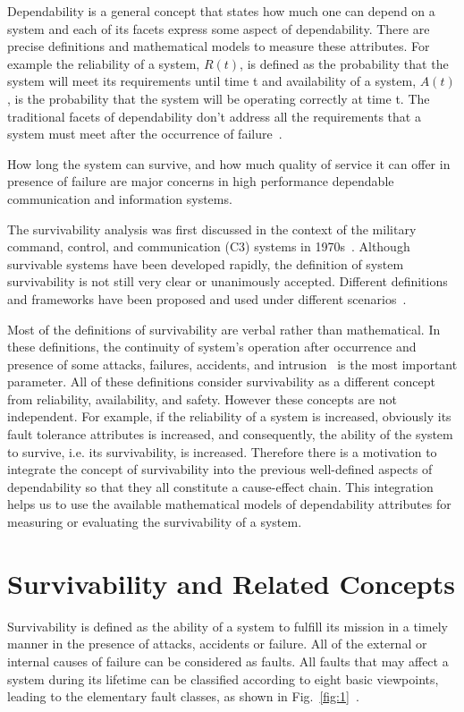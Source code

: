 \documentclass[onecolumn,conference]{IEEEtran}
\begin{document}
    Dependability is a general concept that states how much one can depend on a system and each of its facets express some aspect of dependability. There are precise definitions and mathematical models to measure these attributes. For example the reliability of a system, $R(t)$, is defined as the probability that the system will meet its requirements until time t and availability of a system, $A(t)$, is the probability that the system will be operating correctly at time t. The traditional facets of dependability don't address all the requirements that a system must meet after the occurrence of failure~\cite{b8}.

    How long the system can survive, and how much quality of service it can offer in presence of failure are major concerns in high performance dependable communication and information systems.

    The survivability analysis was first discussed in the context of the military command, control, and communication (C3) systems in 1970s~\cite{b7}. Although survivable systems have been developed rapidly, the definition of system survivability is not still very clear or unanimously accepted. Different definitions and frameworks have been proposed and used under different scenarios~\cite{b10, b12, b18}.

    Most of the definitions of survivability are verbal rather than mathematical. In these definitions, the continuity of system's operation after occurrence and presence of some attacks, failures, accidents, and intrusion~\cite{b11, b13, b14, b15, b16} is the most important parameter. All of these definitions consider survivability as a different concept from reliability, availability, and safety. However these concepts are not independent. For example, if the reliability of a system is increased, obviously its fault tolerance attributes is increased, and consequently, the ability of the system to survive, i.e. its survivability, is increased. Therefore there is a motivation to integrate the concept of survivability into the previous well-defined aspects of dependability so that they all constitute a cause-effect chain. This integration helps us to use the available mathematical models of dependability attributes for measuring or evaluating the survivability of a system.

    \section{Survivability and Related Concepts} \label{sec:rlwork}
    Survivability is defined as the ability of a system to fulfill its mission in a timely manner in the presence of attacks, accidents or failure. All of the external or internal causes of failure can be considered as faults. All faults that may affect a system during its lifetime can be classified according to eight basic viewpoints, leading to the elementary fault classes, as shown in Fig.~\ref{fig:1}~\cite{b1}.
\end{document}

